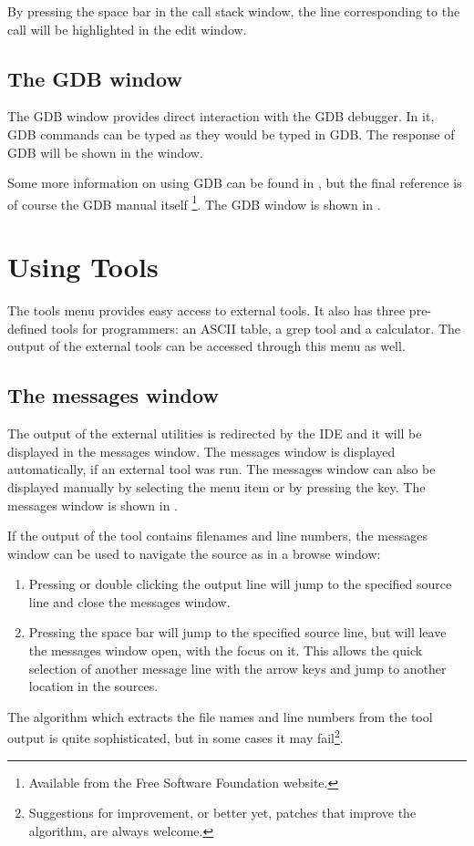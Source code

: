 By pressing the space bar in the call stack window, the line corresponding
to the call will be highlighted in the edit window.

\subsection{The GDB window}
\label{se:gdbwindow}
The GDB window provides direct interaction with the GDB debugger.
In it, GDB commands can be typed as they would be typed in GDB.
The response of GDB will be shown in the window.

Some more information on using GDB can be found in , but
the final reference is of course the GDB manual itself
\footnote{Available from the Free Software Foundation website.}.
The GDB window is shown in .


\section{Using Tools}
\label{se:toolsmenu}
The tools menu provides easy access to external tools. It also has
three pre-defined tools for programmers: an ASCII table,  a grep tool
and a calculator. The output of the external tools can be accessed through
this menu as well.

%
%
\subsection{The messages window}
\label{se:toolsmessages}
The output of the external utilities is redirected by the IDE and it
will be displayed in the messages window. The messages window is
displayed automatically, if an external tool was run. The
messages window can also be displayed manually by selecting the
menu item  or by pressing the  key.
The messages window is shown in .


If the output of the tool contains filenames and line numbers,
the messages window can be used to navigate the source as in a browse
window:
\begin{enumerate}
\item Pressing  or double clicking the output line will jump
to the specified source line and close the messages window.
\item Pressing the space bar will jump to the specified source line, but
will leave the messages window open, with the focus on it. This allows the
quick selection of another message line with the arrow keys and jump to
another location in the sources.
\end{enumerate}
The algorithm which extracts the file names and line numbers from
the tool output is quite sophisticated, but in some cases it may
fail\footnote{Suggestions for improvement, or better yet, patches
that improve the algorithm, are always welcome.}.
%
%
